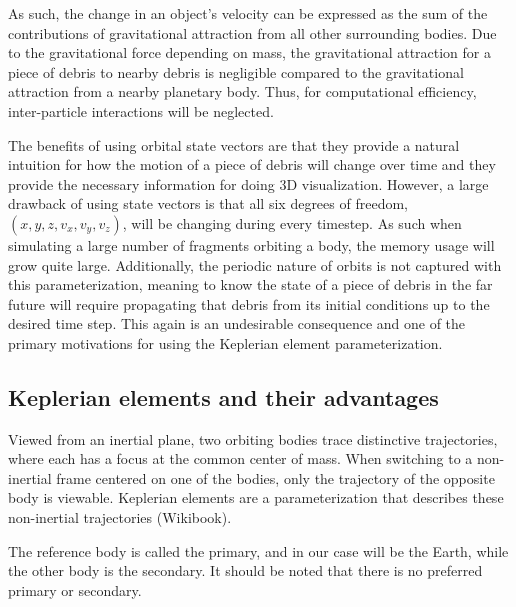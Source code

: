 \documentclass{article}
\begin{document}
As such, the change in an object's velocity can be expressed as the sum of the contributions of gravitational attraction from all other surrounding bodies. Due to the gravitational force depending on mass, the gravitational attraction for a piece of debris to nearby debris is negligible compared to the gravitational attraction from a nearby planetary body. Thus, for computational efficiency, inter-particle interactions will be neglected.

The benefits of using orbital state vectors are that they provide a natural intuition for how the motion of a piece of debris will change over time and they provide the necessary information for doing 3D visualization. However, a large drawback of using state vectors is that all six degrees of freedom, $ (x, y, z, v_x, v_y, v_z)$, will be changing during every timestep. As such when simulating a large number of fragments orbiting a body, the memory usage will grow quite large. Additionally, the periodic nature of orbits is not captured with this parameterization, meaning to know the state of a piece of debris in the far future will require propagating that debris from its initial conditions up to the desired time step. This again is an undesirable consequence and one of the primary motivations for using the Keplerian element parameterization.
 
\newpage
\subsection{Keplerian elements and their advantages}

Viewed from an inertial plane, two orbiting bodies trace distinctive trajectories, where each has a focus at the common center of mass. When switching to a non-inertial frame centered on one of the bodies, only the trajectory of the opposite body is viewable. Keplerian elements are a parameterization that describes these non-inertial trajectories (Wikibook).

The reference body is called the primary, and in our case will be the Earth, while the other body is the secondary. It should be noted that there is no preferred primary or secondary.
\end{document}
